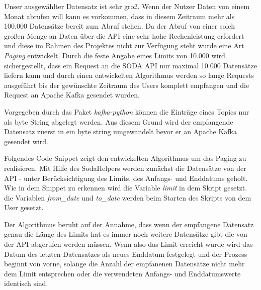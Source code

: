 Unser ausgewählter Datensatz ist sehr groß. Wenn \zb{} der Nutzer Daten von einem Monat abrufen will kann es vorkommen, dass in diesem Zeitraum mehr als 100.000 Datensätze
bereit zum Abruf stehen.
Da der Abruf von einer solch großen Menge an Daten über die API eine sehr hohe Rechenleistung erfordert und diese im Rahmen des Projektes nicht zur Verfügung steht wurde
eine Art \textit{Paging} entwickelt.
Durch die feste Angabe eines Limits von 10.000 wird sichergestellt, dass ein Request an die \ac{SODA} \ac{API} nur maximal 10.000
Datensätze liefern kann und durch einen entwickelten Algorithmus werden so lange Requests ausgeführt bis der gewünschte Zeitraum des Users komplett empfangen und
die Request an Apache Kafka gesendet wurden.

Vorgegeben durch das Paket \textit{kafka-python} können die Einträge eines Topics nur als byte String abgelegt werden.
Aus diesem Grund wird der empfangende Datensatz zuerst in ein byte string umgewandelt bevor er an Apache Kafka gesendet wird.

Folgendes Code Snippet zeigt den entwickelten Algorithmus um das Paging zu realisieren.
Mit Hilfe des SodaHelpers werden zunächst die Datensätze von der API - unter Berücksichtigung des Limits, des Anfangs- und Enddatums geholt.
Wie in dem Snippet zu erkennen wird die Variable \textit{limit} in dem Skript gesetzt.
die Variablen \textit{from\_date} und \textit{to\_date} werden beim Starten des Skripts von dem User gesetzt.

Der Algorithmus beruht auf der Annahme, dass wenn der empfangene Datensatz genau die Länge des Limits hat es immer noch weitere Datensätze gibt die von der API abgerufen werden müssen.
Wenn also das Limit erreicht wurde wird das Datum des letzten Datensatzes als neues Enddatum festgelegt und der Prozess beginnt von vorne, solange die Anzahl der empfanenen Datensätze nicht mehr dem Limit entsprechen
oder die verwendeten Anfangs- und Enddatumswerte identisch sind.


